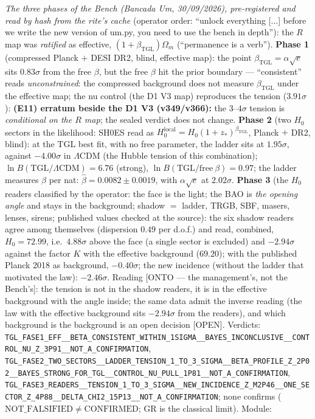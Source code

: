 \documentclass[11pt]{article}
\newcommand{\bTGL}{\beta_{\mathrm{TGL}}}\newcommand{\Msun}{M_{\odot}}\newcommand{\TGL}{\mathrm{TGL}}
\theoremstyle{definition}\newtheorem{deriv}{Derivation}
\begin{document}
\emph{The three phases of the Bench (Bancada Um, 30/09/2026), pre-registered and read by hash from the rite's cache} (operator order: ``unlock everything [...] before we write the new version of um.py, you need to use the bench in depth''): the $R$ map was \emph{ratified} as effective, $(1+\bTGL)\Omega_m$ (``permanence is a verb''). \textbf{Phase 1} (compressed Planck $+$ DESI DR2, blind, effective map): the point $\bTGL=\alpha\sqrt e$ sits $0.83\sigma$ from the free $\beta$, but the free $\beta$ hit the prior boundary --- ``consistent'' reads \emph{unconstrained}: the compressed background does not measure $\bTGL$ under the effective map; the nu control (the D1 V3 map) reproduces the tension ($3.91\sigma$): \textbf{(E11) erratum beside the D1 V3 (v349/v366):} the $3$--$4\sigma$ tension is \emph{conditional on the $R$ map}; the sealed verdict does not change. \textbf{Phase 2} (two $H_0$ sectors in the likelihood: SH0ES read as $H_0^{\mathrm{local}}=H_0(1+z_*)^{\bTGL}$, Planck $+$ DR2, blind): at the TGL best fit, with no free parameter, the ladder sits at $1.95\sigma$, against $-4.00\sigma$ in $\Lambda$CDM (the Hubble tension of this combination); $\ln B(\mathrm{TGL}/\Lambda\mathrm{CDM})=6.76$ (strong), $\ln B(\mathrm{TGL}/\mathrm{free}\ \beta)=0.97$; the ladder measures $\beta$ per nat: $\hat\beta=0.0082\pm0.0019$, with $\alpha\sqrt e$ at $2.02\sigma$. \textbf{Phase 3} (the $H_0$ readers classified by the operator: the face is the light; the BAO is \emph{the opening angle} and stays in the background; shadow $=$ ladder, TRGB, SBF, masers, lenses, sirens; published values checked at the source): the six shadow readers agree among themselves (dispersion $0.49$ per d.o.f.) and read, combined, $H_0=72.99$, i.e.\ $4.88\sigma$ above the face (a single sector is excluded) and $-2.94\sigma$ against the factor $K$ with the effective background ($69.20$); with the published Planck 2018 as background, $-0.40\sigma$; the new incidence (without the ladder that motivated the law): $-2.46\sigma$. Reading \textsf{[ONTO --- the management's, not the Bench's]}: the tension is not in the shadow readers, it is in the effective background with the angle inside; the same data admit the inverse reading (the law with the effective background sits $-2.94\sigma$ from the readers), and which background is the background is an open decision \textsf{[OPEN]}. Verdicts: \texttt{TGL\_FASE1\_EFF\_\_BETA\_CONSISTENT\_WITHIN\_1SIGMA\_\_BAYES\_INCONCLUSIVE\_\_CONTROL\_NU\_Z\_3P91\_\_NOT\_A\_CONFIRMATION}, \texttt{TGL\_FASE2\_TWO\_SECTORS\_\_LADDER\_TENSION\_1\_TO\_3\_SIGMA\_\_BETA\_PROFILE\_Z\_2P02\_\_BAYES\_STRONG\_FOR\_TGL\_\_CONTROL\_NU\_PULL\_1P81\_\_NOT\_A\_CONFIRMATION}, \texttt{TGL\_FASE3\_READERS\_\_TENSION\_1\_TO\_3\_SIGMA\_\_NEW\_INCIDENCE\_Z\_M2P46\_\_ONE\_SECTOR\_Z\_4P88\_\_DELTA\_CHI2\_15P13\_\_NOT\_A\_CONFIRMATION}; none confirms ($\mathrm{NOT\_FALSIFIED}\neq\mathrm{CONFIRMED}$; GR is the classical limit). Module: 
\end{document}
